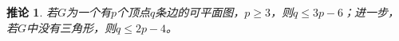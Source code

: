 \documentclass{article}
\begin{document}
\begin{CJK}{UTF8}{gbsn}
  \newtheorem*{cor}{推论}
  \Large
  \begin{cor}
    若$G$为一个有$p$个顶点$q$条边的可平面图，$p\geq 3$，则$q \leq 3p - 6$；进一步，若$G$中没有三角形，则$q \leq 2p -4$。
  \end{cor}


\end{CJK}
\end{document}
